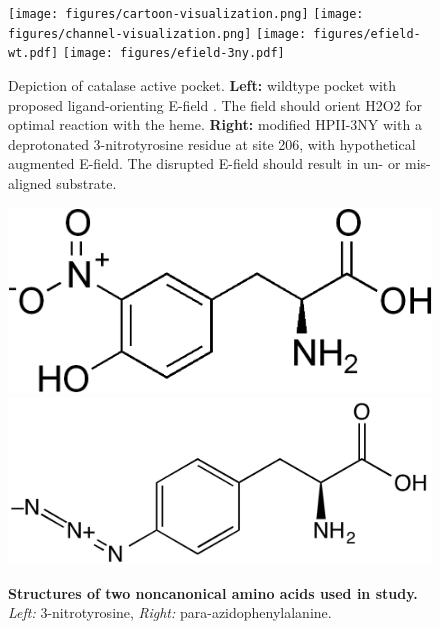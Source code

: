 \documentclass[9pt,twocolumn,twoside]{pnas-new}
\begin{document}
\begin{figure}
  \texttt{[image: figures/cartoon-visualization.png]}
  \texttt{[image: figures/channel-visualization.png]}
  \texttt{[image: figures/efield-wt.pdf]}
  \texttt{[image: figures/efield-3ny.pdf]}%
  \caption{Depiction of catalase active pocket. \textbf{Left:} wildtype pocket with proposed ligand-orienting E-field \cite{electricpotential}. The field should orient H2O2 for optimal reaction with the heme. \textbf{Right:} modified HPII-3NY with a deprotonated 3-nitrotyrosine residue at site 206, with hypothetical augmented E-field. The disrupted E-field should result in un- or mis-aligned substrate.}
  \label{fig:hypothesis}
\end{figure}

\begin{figure}
  \includegraphics[width=0.4\linewidth]{figures/3ny.png}
  \hspace{0.1\linewidth}
  \includegraphics[width=0.5\linewidth]{figures/pazf.png}
  \caption{\textbf{Structures of two noncanonical amino acids used in study.} \textit{Left:} 3-nitrotyrosine, \textit{Right:} para-azidophenylalanine.}
\end{figure}
\end{document}
